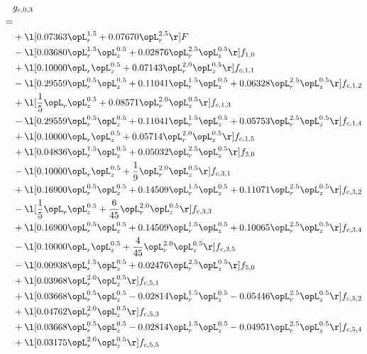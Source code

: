 \begin{alignat}{2} 
\label{eq:g_03_0} 
& g_{c,0,3} \nonumber \\ 
 = \\ 
& + \l[  0.07363 \opL_r^{1.5} +  0.07670 \opL_r^{2.5}  \r] F \nonumber \\ 
& - \l[  0.03680 \opL_r^{1.5} \opL_z^{0.5} +  0.02876 \opL_r^{2.5} \opL_z^{0.5}  \r] f_{1,0} \nonumber \\ 
& + \l[  0.10000 \opL_r \opL_z^{0.5} +  0.07143 \opL_r^{2.0} \opL_z^{0.5}  \r] f_{c,1,1} \nonumber \\ 
& - \l[  0.29559 \opL_r^{0.5} \opL_z^{0.5} +  0.11041 \opL_r^{1.5} \opL_z^{0.5} +  0.06328 \opL_r^{2.5} \opL_z^{0.5}  \r] f_{c,1,2} \nonumber \\ 
& + \l[ \frac{1}{5} \opL_r \opL_z^{0.5} +  0.08571 \opL_r^{2.0} \opL_z^{0.5}  \r] f_{c,1,3} \nonumber \\ 
& - \l[  0.29559 \opL_r^{0.5} \opL_z^{0.5} +  0.11041 \opL_r^{1.5} \opL_z^{0.5} +  0.05753 \opL_r^{2.5} \opL_z^{0.5}  \r] f_{c,1,4} \nonumber \\ 
& + \l[  0.10000 \opL_r \opL_z^{0.5} +  0.05714 \opL_r^{2.0} \opL_z^{0.5}  \r] f_{c,1,5} \nonumber \\ 
& + \l[  0.04836 \opL_r^{1.5} \opL_z^{0.5} +  0.05032 \opL_r^{2.5} \opL_z^{0.5}  \r] f_{3,0} \nonumber \\ 
& - \l[  0.10000 \opL_r \opL_z^{0.5} + \frac{1}{9} \opL_r^{2.0} \opL_z^{0.5}  \r] f_{c,3,1} \nonumber \\ 
& + \l[  0.16900 \opL_r^{0.5} \opL_z^{0.5} +  0.14509 \opL_r^{1.5} \opL_z^{0.5} +  0.11071 \opL_r^{2.5} \opL_z^{0.5}  \r] f_{c,3,2} \nonumber \\ 
& - \l[ \frac{1}{5} \opL_r \opL_z^{0.5} + \frac{6}{45} \opL_r^{2.0} \opL_z^{0.5}  \r] f_{c,3,3} \nonumber \\ 
& + \l[  0.16900 \opL_r^{0.5} \opL_z^{0.5} +  0.14509 \opL_r^{1.5} \opL_z^{0.5} +  0.10065 \opL_r^{2.5} \opL_z^{0.5}  \r] f_{c,3,4} \nonumber \\ 
& - \l[  0.10000 \opL_r \opL_z^{0.5} + \frac{4}{45} \opL_r^{2.0} \opL_z^{0.5}  \r] f_{c,3,5} \nonumber \\ 
& - \l[  0.00938 \opL_r^{1.5} \opL_z^{0.5} +  0.02476 \opL_r^{2.5} \opL_z^{0.5}  \r] f_{5,0} \nonumber \\ 
& + \l[  0.03968 \opL_r^{2.0} \opL_z^{0.5}  \r] f_{c,5,1} \nonumber \\ 
& + \l[  0.03668 \opL_r^{0.5} \opL_z^{0.5}   -0.02814 \opL_r^{1.5} \opL_z^{0.5}   -0.05446 \opL_r^{2.5} \opL_z^{0.5}  \r] f_{c,5,2} \nonumber \\ 
& + \l[  0.04762 \opL_r^{2.0} \opL_z^{0.5}  \r] f_{c,5,3} \nonumber \\ 
& + \l[  0.03668 \opL_r^{0.5} \opL_z^{0.5}   -0.02814 \opL_r^{1.5} \opL_z^{0.5}   -0.04951 \opL_r^{2.5} \opL_z^{0.5}  \r] f_{c,5,4} \nonumber \\ 
& + \l[  0.03175 \opL_r^{2.0} \opL_z^{0.5}  \r] f_{c,5,5} \nonumber \\ 
\end{alignat} 


